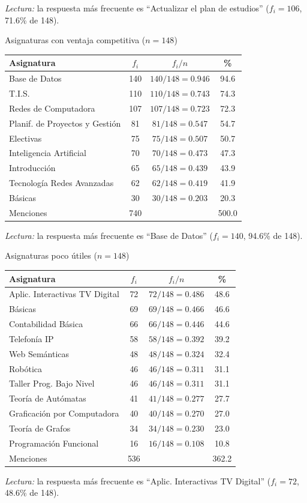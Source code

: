 \textit{Lectura:} la respuesta más frecuente es ``Actualizar el plan de estudios'' ($f_i = 106$, 71.6\% de 148).

\begin{mitabla}{Asignaturas con ventaja competitiva ($n=148$)}
\begin{tabular}{lccc}
\toprule
Asignatura & $f_i$ & $f_i / n$ & \% \\
\midrule
Base de Datos & 140 & $140/148 = 0.946$ & 94.6 \\
T.I.S. & 110 & $110/148 = 0.743$ & 74.3 \\
Redes de Computadora & 107 & $107/148 = 0.723$ & 72.3 \\
Planif. de Proyectos y Gestión & 81 & $81/148 = 0.547$ & 54.7 \\
Electivas & 75 & $75/148 = 0.507$ & 50.7 \\
Inteligencia Artificial & 70 & $70/148 = 0.473$ & 47.3 \\
Introducción & 65 & $65/148 = 0.439$ & 43.9 \\
Tecnología Redes Avanzadas & 62 & $62/148 = 0.419$ & 41.9 \\
Básicas & 30 & $30/148 = 0.203$ & 20.3 \\
\midrule
Menciones & 740 & & 500.0 \\
\bottomrule
\end{tabular}
\end{mitabla}

\textit{Lectura:} la respuesta más frecuente es ``Base de Datos'' ($f_i = 140$, 94.6\% de 148).

\begin{mitabla}{Asignaturas poco útiles ($n=148$)}
\begin{tabular}{lccc}
\toprule
Asignatura & $f_i$ & $f_i / n$ & \% \\
\midrule
Aplic. Interactivas TV Digital & 72 & $72/148 = 0.486$ & 48.6 \\
Básicas & 69 & $69/148 = 0.466$ & 46.6 \\
Contabilidad Básica & 66 & $66/148 = 0.446$ & 44.6 \\
Telefonía IP & 58 & $58/148 = 0.392$ & 39.2 \\
Web Semánticas & 48 & $48/148 = 0.324$ & 32.4 \\
Robótica & 46 & $46/148 = 0.311$ & 31.1 \\
Taller Prog. Bajo Nivel & 46 & $46/148 = 0.311$ & 31.1 \\
Teoría de Autómatas & 41 & $41/148 = 0.277$ & 27.7 \\
Graficación por Computadora & 40 & $40/148 = 0.270$ & 27.0 \\
Teoría de Grafos & 34 & $34/148 = 0.230$ & 23.0 \\
Programación Funcional & 16 & $16/148 = 0.108$ & 10.8 \\
\midrule
Menciones & 536 & & 362.2 \\
\bottomrule
\end{tabular}
\end{mitabla}

\textit{Lectura:} la respuesta más frecuente es ``Aplic. Interactivas TV Digital'' ($f_i = 72$, 48.6\% de 148).

